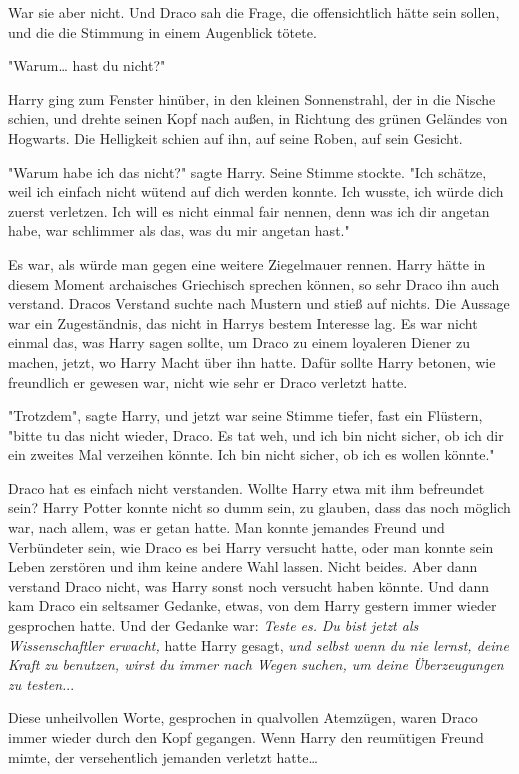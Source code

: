{War sie aber nicht. Und Draco sah die Frage, die offensichtlich hätte sein sollen, und die die Stimmung in einem Augenblick tötete.

"Warum… hast du nicht?"

Harry ging zum Fenster hinüber, in den kleinen Sonnenstrahl, der in die Nische schien, und drehte seinen Kopf nach außen, in Richtung des grünen Geländes von Hogwarts. Die Helligkeit schien auf ihn, auf seine Roben, auf sein Gesicht.

"Warum habe ich das nicht?" sagte Harry. Seine Stimme stockte. "Ich schätze, weil ich einfach nicht wütend auf dich werden konnte. Ich wusste, ich würde dich zuerst verletzen. Ich will es nicht einmal fair nennen, denn was ich dir angetan habe, war schlimmer als das, was du mir angetan hast."

Es war, als würde man gegen eine weitere Ziegelmauer rennen. Harry hätte in diesem Moment archaisches Griechisch sprechen können, so sehr Draco ihn auch verstand. Dracos Verstand suchte nach Mustern und stieß auf nichts. Die Aussage war ein Zugeständnis, das nicht in Harrys bestem Interesse lag. Es war nicht einmal das, was Harry sagen sollte, um Draco zu einem loyaleren Diener zu machen, jetzt, wo Harry Macht über ihn hatte. Dafür sollte Harry betonen, wie freundlich er gewesen war, nicht wie sehr er Draco verletzt hatte.

"Trotzdem", sagte Harry, und jetzt war seine Stimme tiefer, fast ein Flüstern, "bitte tu das nicht wieder, Draco. Es tat weh, und ich bin nicht sicher, ob ich dir ein zweites Mal verzeihen könnte. Ich bin nicht sicher, ob ich es wollen könnte."

Draco hat es einfach nicht verstanden. Wollte Harry etwa mit ihm befreundet sein? Harry Potter konnte nicht so dumm sein, zu glauben, dass das noch möglich war, nach allem, was er getan hatte. Man konnte jemandes Freund und Verbündeter sein, wie Draco es bei Harry versucht hatte, oder man konnte sein Leben zerstören und ihm keine andere Wahl lassen. Nicht beides. Aber dann verstand Draco nicht, was Harry sonst noch versucht haben könnte. Und dann kam Draco ein seltsamer Gedanke, etwas, von dem Harry gestern immer wieder gesprochen hatte. Und der Gedanke war: \emph{Teste es.} \emph{Du bist jetzt als Wissenschaftler erwacht,} hatte Harry gesagt, \emph{und selbst wenn du nie lernst, deine Kraft zu benutzen, wirst du immer nach Wegen suchen, um deine Überzeugungen zu testen.}..

Diese unheilvollen Worte, gesprochen in qualvollen Atemzügen, waren Draco immer wieder durch den Kopf gegangen. Wenn Harry den reumütigen Freund mimte, der versehentlich jemanden verletzt hatte…

}
